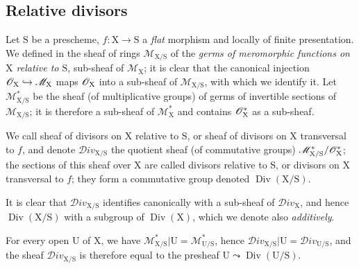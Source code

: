 \subsection{Relative divisors}
\label{subsection:IV.21.15}
\label{IV.21.15}

\begin{env}[21.15.1]
\label{IV.21.15.1}
Let $\mathrm{S}$ be a prescheme, $f:\mathrm{X}\to\mathrm{S}$ a \emph{flat} morphism and locally of finite presentation.
We defined in  the sheaf of rings $\mathscr{M}_{\mathrm{X}/\mathrm{S}}$ of the \emph{germs of meromorphic functions on $\mathrm{X}$ relative to $\mathrm{S}$}, sub-sheaf of $\mathscr{M}_{\mathrm{X}}$; it is clear that the canonical injection $\mathscr{O}_{\mathrm{X}}\hookrightarrow\mathscr{M}_{\mathrm{X}}$  maps $\mathscr{O}_{\mathrm{X}}$ into a sub-sheaf of $\mathscr{M}_{\mathrm{X}/\mathrm{S}}$, with which we identify it.
Let $\mathscr{M}_{\mathrm{X}/\mathrm{S}}^*$ be the sheaf (of multiplicative groups) of germs of invertible sections of $\mathscr{M}_{\mathrm{X}/\mathrm{S}}$; it is therefore a sub-sheaf of $\mathscr{M}_{\mathrm{X}}^*$ and contains $\mathscr{O}_{\mathrm{X}}^*$ as a sub-sheaf.
\end{env}

\begin{definition}[21.15.2]
\label{IV.21.15.2}
We call sheaf of divisors on $\mathrm{X}$ relative to $\mathrm{S}$, or sheaf of divisors on $\mathrm{X}$ transversal to $f$, and denote $\mathscr{D}iv_{\mathrm{X}/\mathrm{S}}$ the quotient sheaf (of commutative groups) $\mathscr{M}_{\mathrm{X}/\mathrm{S}}^*/\mathscr{O}_{\mathrm{X}}^*$; the sections of this sheaf over $\mathrm{X}$ are called divisors relative to $\mathrm{S}$, or divisors on $\mathrm{X}$ transversal to $f$; they form a commutative group denoted $\operatorname{Div}(\mathrm{X}/\mathrm{S})$.
\end{definition}

It is clear that $\mathscr{D}iv_{\mathrm{X}/\mathrm{S}}$ identifies canonically with a sub-sheaf of $\mathscr{D}iv_{\mathrm{X}}$, and hence $\operatorname{Div}(\mathrm{X}/\mathrm{S})$ with a subgroup of $\operatorname{Div}(\mathrm{X})$, which we denote also \emph{additively}.

For every open $\mathrm{U}$ of $\mathrm{X}$, we have $\mathscr{M}_{\mathrm{X}/\mathrm{S}}^*|\mathrm{U}=\mathscr{M}_{\mathrm{U}/\mathrm{S}}^*$, hence $\mathscr{D}iv_{\mathrm{X}/\mathrm{S}}|\mathrm{U}=\mathscr{D}iv_{\mathrm{U}/\mathrm{S}}$, and the sheaf $\mathscr{D}iv_{\mathrm{X}/\mathrm{S}}$ is therefore equal to the presheaf $\mathrm{U}\leadsto\operatorname{Div}(\mathrm{U}/\mathrm{S})$.

